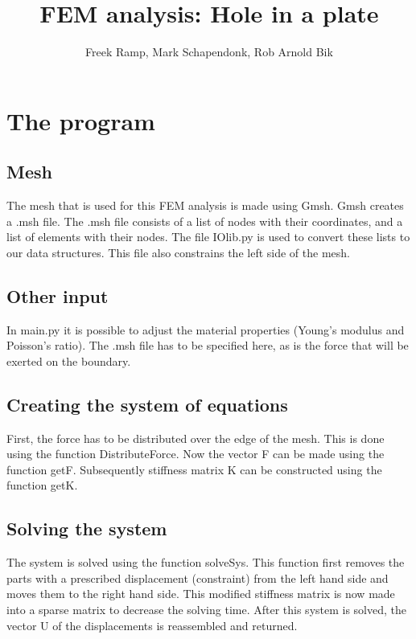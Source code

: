 \documentclass[11pt]{article}
\title{FEM analysis: Hole in a plate}
\author{Freek Ramp, Mark Schapendonk, Rob Arnold Bik}
\begin{document}
\maketitle

\begin{boxedminipage}{\textwidth}
\tableofcontents
\end{boxedminipage}

\pagebreak

\section{The program}

\subsection{Mesh}
The mesh that is used for this FEM analysis is made using Gmsh. Gmsh creates a .msh file. The .msh file consists of a list of nodes with their coordinates, and a list of elements with their nodes. The file IOlib.py is used to convert these lists to our data structures. This file also constrains the left side of the mesh. 
\subsection{Other input}
In main.py it is possible to adjust the material properties (Young's modulus and Poisson's ratio). The .msh file has to be specified here, as is the force that will be exerted on the boundary. 
\subsection{Creating the system of equations}
First, the force has to be distributed over the edge of the mesh. This is done using the function Distribute\textunderscore Force. Now the vector F can be made using the function getF. Subsequently stiffness matrix K can be constructed using the function getK. 
\subsection{Solving the system}
The system is solved using the function solveSys. This function first removes the parts with a prescribed displacement (constraint) from the left hand side and moves them to the right hand side. This modified stiffness matrix is now made into a sparse matrix to decrease the solving time. After this system is solved, the vector U of the displacements is reassembled and returned. 
\end{document}

